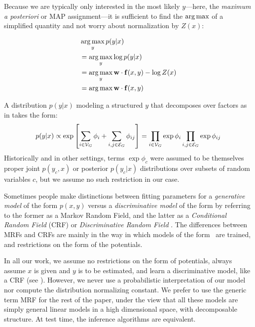 Because we are typically only interested in the most likely $y$---here, the 
{\em maximum a posteriori} or MAP assignment---it is sufficient to find the 
$\mathop{\arg\max}$ of a simplified quantity and not worry about normalization by $Z(x)$:

\begin{align}
&\mathop{\arg\max}_y p(y|x) \\
&= \mathop{\arg\max}_y \log p(y|x) \\
&= \mathop{\arg\max}_y \mathbf{w} \cdot \mathbf{f}(x,y) - \log Z(x) \\
&= \mathop{\arg\max} \mathbf{w} \cdot \mathbf{f}(x,y)
\end{align}

A distribution $p(y|x)$ modeling a structured $y$ that decomposes over factors 
as in  takes the form:
\begin{equation}
p(y|x) \propto\exp\left[  \sum_{i \in \mathcal{V}_G} \phi_i + \sum_{i,j \in \mathcal{E}_G}  
\phi_{ij}\right] = \prod_{i \in \mathcal{V}_G} \exp \phi_i  \prod_{i,j \in \mathcal{E}_G} \exp 
\phi_{ij}
\label{eq:crf}
\end{equation}
Historically and in other settings, terms $\exp \phi_c$ were assumed to be 
themselves proper joint $p(y_c,x)$ or posterior $p(y_c|x)$ distributions over 
subsets of random variables $c$, but we assume no such restriction in our case.  

Sometimes people make distinctions between fitting parameters for a {\em 
generative model} of the form $p(x,y)$ versus a {\em discriminative model} of 
the form by referring to the former as a Markov Random Field, and the latter as 
a {\em Conditional Random Field} (CRF) \citep{lafferty01crfs} or {\em 
Discriminative Random Field} \citep{kumar2003discriminative}.  The differences 
between MRFs and CRFs are mainly in the way in which models of the 
form~ are trained, and restrictions on the form of the potentials.  

In all our work, we assume no restrictions on the form of potentials, always 
assume $x$ is given and $y$ is to be estimated, and learn a discriminative 
model, like a CRF (see ).  However, we never use a 
probabilistic interpretation of our model nor compute the distribution 
normalizing constant.  We prefer to use the generic term MRF for the rest of 
the paper, under the view that all these models are simply general linear 
models in a high dimensional space, with decomposable structure.  At test time, 
the inference algorithms are equivalent.  

